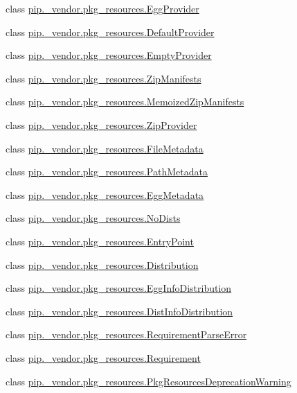 \begin{DoxyCompactItemize}
\item 
class \hyperlink{classpip_1_1__vendor_1_1pkg__resources_1_1EggProvider}{pip.\+\_\+vendor.\+pkg\+\_\+resources.\+Egg\+Provider}
\item 
class \hyperlink{classpip_1_1__vendor_1_1pkg__resources_1_1DefaultProvider}{pip.\+\_\+vendor.\+pkg\+\_\+resources.\+Default\+Provider}
\item 
class \hyperlink{classpip_1_1__vendor_1_1pkg__resources_1_1EmptyProvider}{pip.\+\_\+vendor.\+pkg\+\_\+resources.\+Empty\+Provider}
\item 
class \hyperlink{classpip_1_1__vendor_1_1pkg__resources_1_1ZipManifests}{pip.\+\_\+vendor.\+pkg\+\_\+resources.\+Zip\+Manifests}
\item 
class \hyperlink{classpip_1_1__vendor_1_1pkg__resources_1_1MemoizedZipManifests}{pip.\+\_\+vendor.\+pkg\+\_\+resources.\+Memoized\+Zip\+Manifests}
\item 
class \hyperlink{classpip_1_1__vendor_1_1pkg__resources_1_1ZipProvider}{pip.\+\_\+vendor.\+pkg\+\_\+resources.\+Zip\+Provider}
\item 
class \hyperlink{classpip_1_1__vendor_1_1pkg__resources_1_1FileMetadata}{pip.\+\_\+vendor.\+pkg\+\_\+resources.\+File\+Metadata}
\item 
class \hyperlink{classpip_1_1__vendor_1_1pkg__resources_1_1PathMetadata}{pip.\+\_\+vendor.\+pkg\+\_\+resources.\+Path\+Metadata}
\item 
class \hyperlink{classpip_1_1__vendor_1_1pkg__resources_1_1EggMetadata}{pip.\+\_\+vendor.\+pkg\+\_\+resources.\+Egg\+Metadata}
\item 
class \hyperlink{classpip_1_1__vendor_1_1pkg__resources_1_1NoDists}{pip.\+\_\+vendor.\+pkg\+\_\+resources.\+No\+Dists}
\item 
class \hyperlink{classpip_1_1__vendor_1_1pkg__resources_1_1EntryPoint}{pip.\+\_\+vendor.\+pkg\+\_\+resources.\+Entry\+Point}
\item 
class \hyperlink{classpip_1_1__vendor_1_1pkg__resources_1_1Distribution}{pip.\+\_\+vendor.\+pkg\+\_\+resources.\+Distribution}
\item 
class \hyperlink{classpip_1_1__vendor_1_1pkg__resources_1_1EggInfoDistribution}{pip.\+\_\+vendor.\+pkg\+\_\+resources.\+Egg\+Info\+Distribution}
\item 
class \hyperlink{classpip_1_1__vendor_1_1pkg__resources_1_1DistInfoDistribution}{pip.\+\_\+vendor.\+pkg\+\_\+resources.\+Dist\+Info\+Distribution}
\item 
class \hyperlink{classpip_1_1__vendor_1_1pkg__resources_1_1RequirementParseError}{pip.\+\_\+vendor.\+pkg\+\_\+resources.\+Requirement\+Parse\+Error}
\item 
class \hyperlink{classpip_1_1__vendor_1_1pkg__resources_1_1Requirement}{pip.\+\_\+vendor.\+pkg\+\_\+resources.\+Requirement}
\item 
class \hyperlink{classpip_1_1__vendor_1_1pkg__resources_1_1PkgResourcesDeprecationWarning}{pip.\+\_\+vendor.\+pkg\+\_\+resources.\+Pkg\+Resources\+Deprecation\+Warning}
\end{DoxyCompactItemize}
